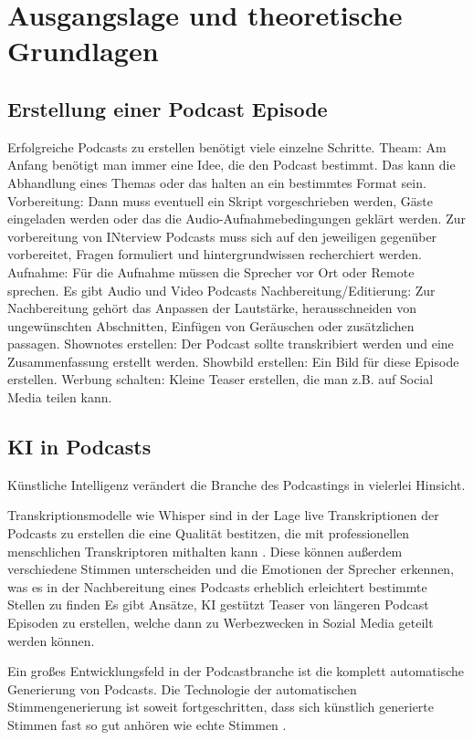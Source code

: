 \chapter{Ausgangslage und theoretische Grundlagen}\label{ch:theoretical}

\section{Erstellung einer Podcast Episode}

Erfolgreiche Podcasts zu erstellen benötigt viele einzelne Schritte.
Theam:
Am Anfang benötigt man immer eine Idee, die den Podcast bestimmt.
Das kann die Abhandlung eines Themas oder das halten an ein bestimmtes Format sein.
Vorbereitung:
Dann muss eventuell ein Skript vorgeschrieben werden, Gäste eingeladen werden oder das die Audio-Aufnahmebedingungen geklärt werden.
Zur vorbereitung von INterview Podcasts muss sich auf den jeweiligen gegenüber vorbereitet, Fragen formuliert und hintergrundwissen recherchiert werden.
Aufnahme:
Für die Aufnahme müssen die Sprecher vor Ort oder Remote sprechen.
Es gibt Audio und Video Podcasts
Nachbereitung/Editierung:
Zur Nachbereitung gehört das Anpassen der Lautstärke, herausschneiden von ungewünschten Abschnitten, Einfügen von Geräuschen oder zusätzlichen passagen.
Shownotes erstellen:
Der Podcast sollte transkribiert werden und eine Zusammenfassung erstellt werden.
Showbild erstellen:
Ein Bild für diese Episode erstellen.
Werbung schalten:
Kleine Teaser erstellen, die man z.B. auf Social Media teilen kann.


\section{KI in Podcasts}

Künstliche Intelligenz verändert die Branche des Podcastings in vielerlei Hinsicht. 

Transkriptionsmodelle wie Whisper sind in der Lage live Transkriptionen der Podcasts zu erstellen die eine Qualität bestitzen, die mit professionellen menschlichen Transkriptoren mithalten kann \cite{radford}.
Diese können außerdem verschiedene Stimmen unterscheiden und die Emotionen der Sprecher erkennen, was es in der Nachbereitung eines Podcasts erheblich erleichtert bestimmte Stellen zu finden \cite{wagner2023}
Es gibt Ansätze, KI gestützt Teaser von längeren Podcast Episoden zu erstellen, welche dann zu Werbezwecken in Sozial Media geteilt werden können. \cite{wang2023}

Ein großes Entwicklungsfeld in der Podcastbranche ist die komplett automatische Generierung von Podcasts. Die Technologie der automatischen Stimmengenerierung ist soweit fortgeschritten, dass sich künstlich generierte Stimmen fast so gut anhören wie echte Stimmen \cite{shi2023}.

